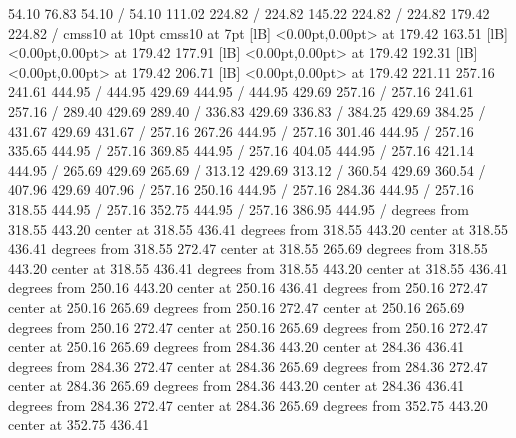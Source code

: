 {\setdashpattern <4pt, 4pt>
 54.10 76.83 54.10 /
 54.10 111.02 224.82 /
 224.82 145.22 224.82 /
 224.82 179.42 224.82 /
\font\picfont cmss10 at 10pt\picfont
\font\picfont cmss10 at 7pt\picfont
{}  [lB] <0.00pt,0.00pt> at 179.42 163.51
  [lB] <0.00pt,0.00pt> at 179.42 177.91
  [lB] <0.00pt,0.00pt> at 179.42 192.31
  [lB] <0.00pt,0.00pt> at 179.42 206.71
  [lB] <0.00pt,0.00pt> at 179.42 221.11
\setsolid
{} 257.16 241.61 444.95 /
 444.95 429.69 444.95 /
 444.95 429.69 257.16 /
 257.16 241.61 257.16 /
\setsolid
{} 289.40 429.69 289.40 /
\setsolid
{} 336.83 429.69 336.83 /
\setsolid
{} 384.25 429.69 384.25 /
\setsolid
{} 431.67 429.69 431.67 /
\setsolid
{} 257.16 267.26 444.95 /
\setsolid
{} 257.16 301.46 444.95 /
\setsolid
{} 257.16 335.65 444.95 /
\setsolid
{} 257.16 369.85 444.95 /
\setsolid
{} 257.16 404.05 444.95 /
\setsolid
{} 257.16 421.14 444.95 /
\setsolid
{} 265.69 429.69 265.69 /
\setsolid
{} 313.12 429.69 313.12 /
\setsolid
{} 360.54 429.69 360.54 /
\setsolid
{} 407.96 429.69 407.96 /
\setsolid
{} 257.16 250.16 444.95 /
\setsolid
{} 257.16 284.36 444.95 /
\setsolid
{} 257.16 318.55 444.95 /
\setsolid
{} 257.16 352.75 444.95 /
\setsolid
{} 257.16 386.95 444.95 /
 degrees from 318.55 443.20 center at 318.55 436.41
 degrees from 318.55 443.20 center at 318.55 436.41
 degrees from 318.55 272.47 center at 318.55 265.69
 degrees from 318.55 443.20 center at 318.55 436.41
 degrees from 318.55 443.20 center at 318.55 436.41
 degrees from 250.16 443.20 center at 250.16 436.41
 degrees from 250.16 272.47 center at 250.16 265.69
 degrees from 250.16 272.47 center at 250.16 265.69
 degrees from 250.16 272.47 center at 250.16 265.69
 degrees from 250.16 272.47 center at 250.16 265.69
 degrees from 284.36 443.20 center at 284.36 436.41
 degrees from 284.36 272.47 center at 284.36 265.69
 degrees from 284.36 272.47 center at 284.36 265.69
 degrees from 284.36 443.20 center at 284.36 436.41
 degrees from 284.36 272.47 center at 284.36 265.69
 degrees from 352.75 443.20 center at 352.75 436.41
}
